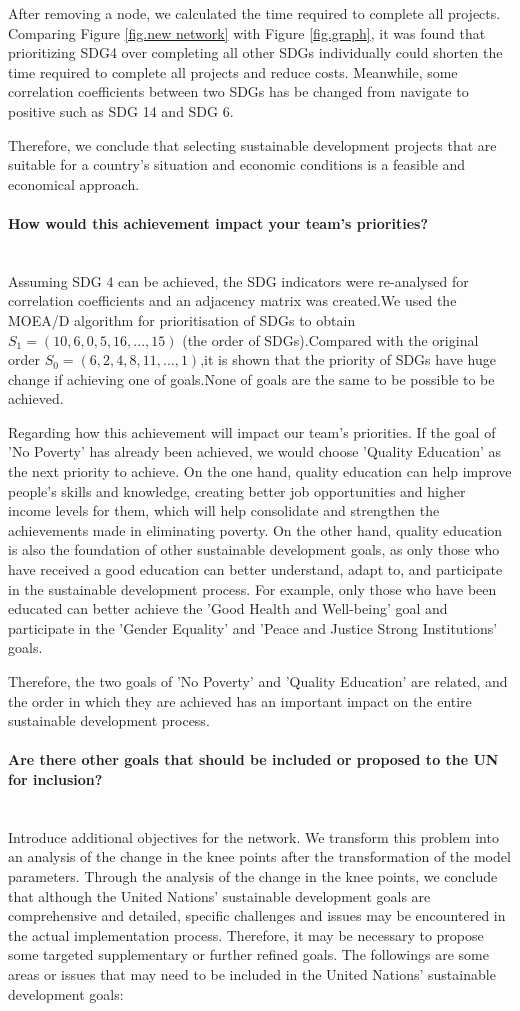 \documentclass[10pt]{mcmthesis}
\newcommand{\subsubsubsection}[1]{\paragraph{#1}\mbox{}\\}
\begin{document}
After removing a node, we calculated the time required to complete all projects. Comparing Figure \ref{fig.new network} with Figure \ref{fig.graph}, it was found that prioritizing SDG4 over completing all other SDGs individually could shorten the time required to complete all projects and reduce costs.
Meanwhile, some correlation coefficients between two SDGs has be changed from navigate to positive such as SDG 14 and SDG 6.

Therefore, we conclude that selecting sustainable development projects that are suitable for a country's situation and economic conditions is a feasible and economical approach.
\subsubsubsection{How would this achievement impact your team’s priorities?}

Assuming SDG 4 can be achieved, the SDG indicators were re-analysed for correlation coefficients and an adjacency matrix was created.We used the MOEA/D algorithm for prioritisation of SDGs to obtain $S_1=(10,6,0,5,16,...,15)$ (the order of SDGs).Compared with the original order $S_0=(6,2,4,8,11,...,1)$,it is shown that the priority of SDGs have huge change if achieving one of goals.None of goals are the same to be possible to be achieved.

Regarding how this achievement will impact our team's priorities. If the goal of 'No Poverty' has already been achieved, we would choose 'Quality Education' as the next priority to achieve. On the one hand, quality education can help improve people's skills and knowledge, creating better job opportunities and higher income levels for them, which will help consolidate and strengthen the achievements made in eliminating poverty. On the other hand, quality education is also the foundation of other sustainable development goals, as only those who have received a good education can better understand, adapt to, and participate in the sustainable development process. For example, only those who have been educated can better achieve the 'Good Health and Well-being' goal and participate in the 'Gender Equality' and 'Peace and Justice Strong Institutions' goals.

Therefore, the two goals of 'No Poverty' and 'Quality Education' are related, and the order in which they are achieved has an important impact on the entire sustainable development process.


\subsubsubsection{Are there other goals that should be included or proposed to the UN for inclusion?}
\indent Introduce additional objectives for the network. We transform this problem into an analysis of the change in the knee points after the transformation of the model parameters. Through the analysis of the change in the knee points, we conclude that although the United Nations' sustainable development goals are comprehensive and detailed, specific challenges and issues may be encountered in the actual implementation process. Therefore, it may be necessary to propose some targeted supplementary or further refined goals. The followings are some areas or issues that may need to be included in the United Nations' sustainable development goals:
\end{document}
